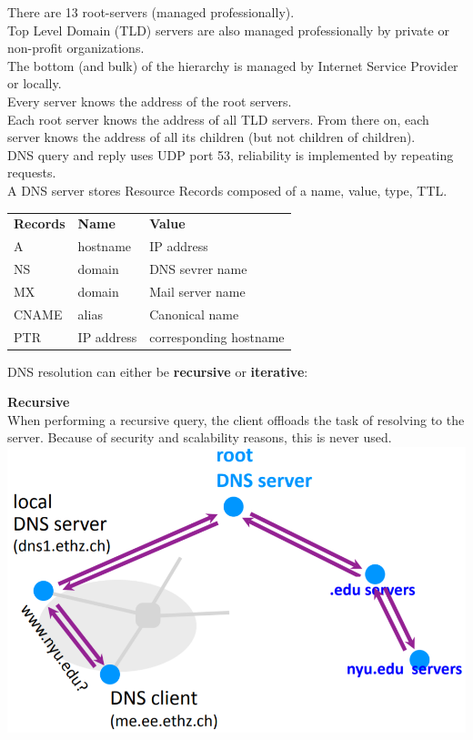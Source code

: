 \documentclass[a4paper, fontsize=8pt, landscape, DIV=1]{scrartcl}
\begin{document}
\begin{multicols*}{4}
		There are 13 root-servers (managed professionally).\\
		Top Level Domain (TLD) servers are also managed professionally by private or non-profit organizations.\\
		The bottom (and bulk) of the hierarchy is managed by Internet Service Provider or locally. \\
		Every server knows the address of the root servers.\\
		Each root server knows the address of all TLD servers. From there on, each server knows the address of all its children (but not children of children).\\
		DNS query and reply uses UDP port 53, reliability is implemented by repeating requests.\\
		A DNS server stores Resource Records composed of a name, value, type, TTL.
		\vspace{0.2cm}
		
		\begin{tabular}{l l l}
			\textbf{Records} & \textbf{Name}  & \textbf{Value} \\ 
			A	  & hostname   & IP address  \\ 
			NS	  & domain 	   & DNS sevrer name \\ 
			MX	  & domain 	   & Mail server name \\ 
			CNAME & alias 	   & Canonical name \\  
			PTR	  & IP address & corresponding hostname \\ 
		\end{tabular} 
	
		DNS resolution can either be \textbf{recursive} or \textbf{iterative}:\par
		
		\textbf{Recursive}\\
		When performing a recursive query, the client offloads  the task of resolving to the server. 
		Because of security and scalability reasons, this is never used.\\
		\includegraphics[width=\columnwidth]{images/Application_Layer/dns_recursive.png}
		\par 
		

\end{multicols*}
\end{document}
